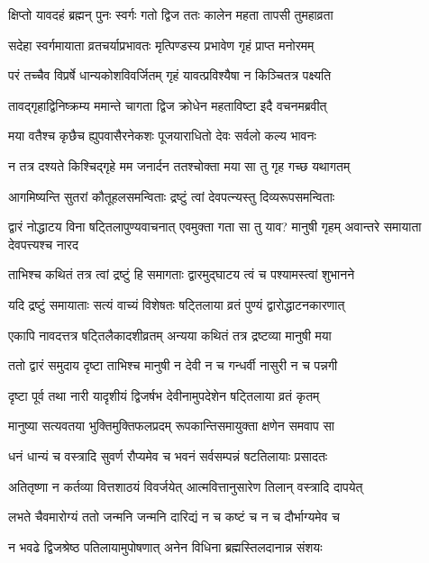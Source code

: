 \twolineshloka
{क्षिप्तो यावदहं ब्रह्मन् पुनः स्वर्गः गतो द्विज}
{ततः कालेन महता तापसी तुमहाव्रता} %

\twolineshloka
{सदेहा स्वर्गमायाता व्रतचर्याप्रभावतः}
{मृत्पिण्डस्य प्रभावेण गृहं प्राप्त मनोरमम्} %

\twolineshloka
{परं तच्चैव विप्रर्षे धान्यकोशविवर्जितम्}
{गृहं यावत्प्रविश्यैषा न किञ्चितत्र पक्ष्यति} %

\twolineshloka
{तावद्गृहाद्विनिष्क्रम्य ममान्ते चागता द्विज}
{क्रोधेन महताविष्टा इदै वचनमब्रवीत्} %

\twolineshloka
{मया वतैश्च कृछैच ह्युपवासैरनेकशः}
{पूजयाराधितो देवः सर्वलो कल्य भावनः} %

\twolineshloka
{न तत्र दश्यते किश्चिद्गृहे मम जनार्दन}
{ततश्चोक्ता मया सा तु गृह गच्छ यथागतम्} %

\twolineshloka
{आगमिष्यन्ति सुतरां कौतूहलसमन्विताः}
{द्रष्टुं त्वां देवपत्न्यस्तु दिव्यरूपसमन्विताः} %


\threelineshloka
{द्वारं नोद्धाटय विना षट्तिलापुण्यवाचनात्}
{एवमुक्ता गता सा तु याव? मानुषी गृहम्}
{अवान्तरे समायाता देवपत्त्यश्च नारद} %

\twolineshloka
{ताभिश्च कथितं तत्र त्वां द्रष्टुं हि समागताः}
{द्वारमुद्घाटय त्वं च पश्यामस्त्वां शुभानने} %


\twolineshloka
{यदि द्रष्टुं समायाताः सत्यं वाच्यं विशेषतः}
{षट्तिलाया व्रतं पुण्यं द्वारोद्धाटनकारणात्} %

\twolineshloka
{एकापि नावदत्तत्र षट्तिलैकादशीव्रतम्}
{अन्यया कथितं तत्र द्रष्टव्या मानुषी मया} %

\twolineshloka
{ततो द्वारं समुदाय दृष्टा ताभिश्च मानुषी}
{न देवी न च गन्धर्वी नासुरी न च पन्नगी} %

\twolineshloka
{दृष्टा पूर्व तथा नारी यादृशीयं द्विजर्षभ}
{देवीनामुपदेशेन षट्तिलाया व्रतं कृतम्} %

\twolineshloka
{मानुष्या सत्यवतया भुक्तिमुक्तिफलप्रदम्}
{रूपकान्तिसमायुक्ता क्षणेन समवाप सा} %

\twolineshloka
{धनं धान्यं च वस्त्रादि सुवर्ण रौप्यमेव च}
{भवनं सर्वसम्पन्नं षटतिलायाः प्रसादतः} %

\twolineshloka
{अतितृष्णा न कर्तव्या वित्तशाठयं विवर्जयेत्}
{आत्मवित्तानुसारेण तिलान् वस्त्रादि दापयेत्} %

\twolineshloka
{लभते चैवमारोग्यं ततो जन्मनि जन्मनि}
{दारिद्यं न च कष्टं च न च दौर्भाग्यमेव च} %

\twolineshloka
{न भवढे द्विजश्रेष्ठ पतिलायामुपोषणात्}
{अनेन विधिना ब्रह्मस्तिलदानान्न संशयः} %

